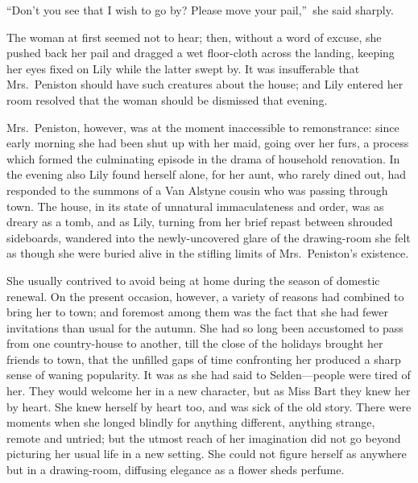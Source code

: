 \documentclass[12pt,a4paper]{book}
\begin{document}
``Don't you see that I wish to go by? Please move your pail,''\ she
said sharply.





The woman at first seemed not to hear; then, without a word of
excuse, she pushed back her pail and dragged a wet floor-cloth
across the landing, keeping her eyes fixed on Lily while the
latter swept by. It was insufferable that Mrs.\ Peniston should
have such creatures about the house; and Lily entered her room
resolved that the woman should be dismissed that evening.





Mrs.\ Peniston, however, was at the moment inaccessible to
remonstrance: since early morning she had been shut up with her
maid, going over her furs, a process which formed the culminating
episode in the drama of household renovation. In the evening also
Lily found herself alone, for her aunt, who rarely dined out, had
responded to the summons of a Van Alstyne cousin who was passing
through town. The house, in its state of unnatural immaculateness
and order, was as dreary as a tomb, and as Lily, turning from her
brief repast between shrouded sideboards, wandered into the
newly-uncovered glare of the drawing-room she felt as though she
were buried alive in the stifling limits of Mrs.\ Peniston's
existence.





She usually contrived to avoid being at home during the season of
domestic renewal. On the present occasion, however, a variety of
reasons had combined to bring her to town; and foremost among
them was the fact that she had fewer invitations than usual for
the autumn. She had so long been accustomed to pass from one
country-house to another, till the close of the holidays brought
her friends to town, that the unfilled gaps of time confronting
her produced a sharp sense of waning popularity. It was as she
had said to Selden---people were tired of her. They would welcome
her in a new character, but as Miss Bart they knew her by heart. 
She knew herself by heart too, and was sick of the old story. 
There were moments when she longed blindly for anything
different, anything strange, remote and untried; but the utmost
reach of her imagination did not go beyond picturing her usual
life in a new setting. She could not figure herself as anywhere
but in a drawing-room, diffusing elegance as a flower sheds
perfume.
\end{document}
